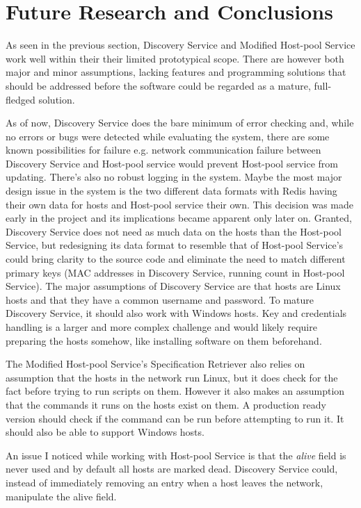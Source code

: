\newpage

\section{Future Research and Conclusions} \label{future}

As seen in the previous section, Discovery Service and Modified Host-pool Service work well within their their limited prototypical scope. There are however both major and minor assumptions, lacking features and programming solutions that should be addressed before the software could be regarded as a mature, full-fledged solution.

As of now, Discovery Service does the bare minimum of error checking and, while no errors or bugs were detected while evaluating the system, there are some known possibilities for failure e.g. network communication failure between Discovery Service and Host-pool service would prevent Host-pool service from updating. There's also no robust logging in the system.
Maybe the most major design issue in the system is the two different data formats with Redis having their own data for hosts and Host-pool service their own. This decision was made early in the project and its implications became apparent only later on. Granted, Discovery Service does not need as much data on the hosts than the Host-pool Service, but redesigning its data format to resemble that of Host-pool Service's could bring clarity to the source code and eliminate the need to match different primary keys (MAC addresses in Discovery Service, running count in Host-pool Service).
The major assumptions of Discovery Service are that hosts are Linux hosts and that they have a common username and password. To mature Discovery Service, it should also work with Windows hosts. Key and credentials handling is a larger and more complex challenge and would likely require preparing the hosts somehow, like installing software on them beforehand.

The Modified Host-pool Service's Specification Retriever also relies on assumption that the hosts in the network run Linux, but it does check for the fact before trying to run scripts on them. However it also makes an assumption that the commands it runs on the hosts exist on them. A production ready version should check if the command can be run before attempting to run it. It should also be able to support Windows hosts.

An issue I noticed while working with Host-pool Service is that the \textit{alive} field is never used and by default all hosts are marked dead. Discovery Service could, instead of immediately removing an entry when a host leaves the network, manipulate the alive field.

